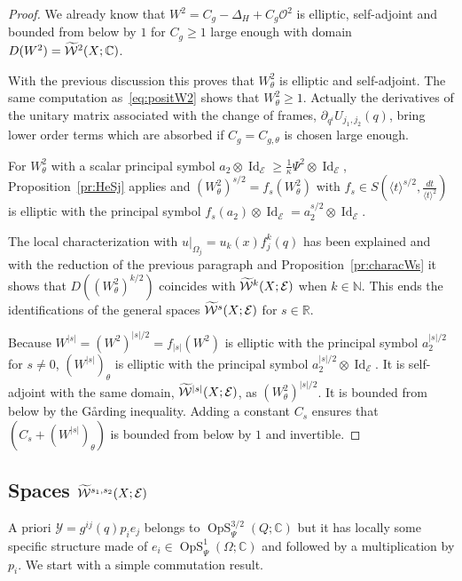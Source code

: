 \documentclass[AHL,Unicode,longabstracts]{cedram}
\newcommand{\C}{\mathbb{C}}
\newcommand{\R}{\mathbb{R}}
\newcommand{\N}{\mathbb{N}}
\newcommand{\clW}{\mathcal{W}}
\newcommand{\clY}{\mathcal{Y}}
\newcommand{\clO}{\mathcal{O}}
\newcommand{\clE}{\mathcal{E}}
\DeclareMathOperator{\OpS}{OpS}
\DeclareMathOperator{\Idd}{Id}
\let\oldtilde\tilde
\renewcommand*{\tilde}[1]{\mathchoice{\widetilde{#1}}{\widetilde{#1}}{\oldtilde{#1}}{\oldtilde{#1}}}
\begin{document}
\begin{proof}
We already know that $W^{2}=C_{g}-\Delta_{H}+C_{g}\clO^{2}$ is elliptic, self-adjoint and bounded from below by $1$ for $C_{g}\geq 1$ large enough with domain $D(W^{2})=\tilde{\clW}^{2}(X;\C)$.

With the previous discussion this proves that $W^{2}_{\theta}$ is elliptic and self-adjoint. The same computation as~\eqref{eq:positW2} shows that $W^{2}_{\theta}\geq 1$. Actually the derivatives of the unitary matrix associated with the change of frames, $\partial_{q^{i}}U_{j_{1},j_{2}}(q)$, bring lower order terms which are absorbed if $C_{g}=C_{g,\theta}$ is chosen large enough.

For $W^{2}_{\theta}$ with a scalar principal symbol $a_{2}\otimes\Idd_{\clE}\geq \frac{1}{\kappa}\Psi^{2}\otimes \Idd_{\clE}$, Proposition~\ref{pr:HeSj} applies and $(W^{2}_{\theta})^{s/2}=f_{s}(W^{2}_{\theta})$ with $f_{s}\in S(\langle t\rangle^{s/2},\frac{dt}{\langle t\rangle^{2}})$ is elliptic with the principal symbol $f_{s}(a_{2})\otimes\Idd_{\clE}=a_{2}^{s/2}\otimes \Idd_{\clE}$.

The local characterization with $u|_{\Omega_{j}}=u_{k}(x)f_{j}^{k}(q)$ has been explained and with the reduction of the previous paragraph and Proposition~\ref{pr:characWs} it shows that $D((W^{2}_{\theta})^{k/2})$ coincides with $\tilde{\clW}^{k}(X;\clE)$ when $k\in \N$. This ends the identifications of the general spaces $\tilde{\clW}^{s}(X;\clE)$ for $s\in \R$.

Because $W^{|s|}=(W^{2})^{|s|/2}=f_{|s|}(W^{2})$ is elliptic with the principal symbol $a_{2}^{|s|/2}$ for $s\neq 0$, $(W^{|s|})_{\theta}$ is elliptic with the principal symbol $a_{2}^{|s|/2}\otimes \Idd_{\clE}$. It is self-adjoint with the same domain, $\tilde{\clW}^{|s|}(X;\clE)$, as $(W^{2}_{\theta})^{|s|/2}$. It is bounded from below by the G\aa rding inequality. Adding a constant $C_{s}$ ensures that $(C_{s}+(W^{|s|})_{\theta})$ is bounded from below by $1$ and invertible.
\end{proof}

\subsection{Spaces \texorpdfstring{$\tilde{\clW}^{s_{1},s_{2}}(X;\clE)$}{W\^s\_1,s\_2(X;E)}}

A priori $\clY=g^{ij}(q)p_{i}e_{j}$ belongs to $\OpS_{\Psi}^{3/2}(Q;\C)$ but it has locally some specific structure made of $e_{i}\in \OpS_{\Psi}^{1}(\Omega;\C)$ and followed by a multiplication by $p_{i}$. We start with a simple commutation result.
\end{document}
